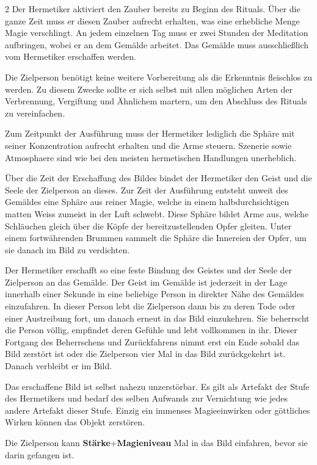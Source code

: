 \begin{multicols*}{2}
Der Hermetiker aktiviert den Zauber bereits zu Beginn des Rituals. Über die ganze Zeit muss er diesen Zauber aufrecht erhalten, was eine erhebliche Menge Magie verschlingt. An jedem einzelnen Tag muss er zwei Stunden der Meditation aufbringen, wobei er an dem Gemälde arbeitet. Das Gemälde muss ausschließlich vom Hermetiker erschaffen werden.

Die Zielperson benötigt keine weitere Vorbereitung als die Erkenntnis fleischlos zu werden. Zu diesem Zwecke sollte er sich selbst mit allen möglichen Arten der Verbrennung, Vergiftung und Ähnlichem martern, um den Abschluss des Rituals zu vereinfachen.

Zum Zeitpunkt der Ausführung muss der Hermetiker lediglich die Sphäre mit seiner Konzentration aufrecht erhalten und die Arme steuern. Szenerie sowie Atmosphaere sind wie bei den meisten hermetischen Handlungen unerheblich.

Über die Zeit der Erschaffung des Bildes bindet der Hermetiker den Geist und die Seele der Zielperson an dieses. Zur Zeit der Ausführung entsteht unweit des Gemäldes eine Sphäre aus reiner Magie, welche in einem halbdurchsichtigen matten Weiss zumeist in der Luft schwebt. Diese Sphäre bildet Arme aus, welche Schläuchen gleich über die Köpfe der bereitzustellenden Opfer gleiten. Unter einem fortwährenden Brummen sammelt die Sphäre die Innereien der Opfer, um sie danach im Bild zu verdichten.

Der Hermetiker erschafft so eine feste Bindung des Geistes und der Seele der Zielperson an das Gemälde. Der Geist im Gemälde ist jederzeit in der Lage innerhalb einer Sekunde in eine beliebige Person in direkter Nähe des Gemäldes einzufahren. In dieser Person lebt die Zielperson dann bis zu deren Tode oder einer Austreibung fort, um danach erneut in das Bild einzukehren. Sie beherrscht die Person völlig, empfindet deren Gefühle und lebt vollkommen in ihr. Dieser Fortgang des Beherrschens und Zurückfahrens nimmt erst ein Ende sobald das Bild zerstört ist oder die Zielperson vier Mal in das Bild zurückgekehrt ist. Danach verbleibt er im Bild.

Das erschaffene Bild ist selbst nahezu unzerstörbar. Es gilt als Artefakt der Stufe des Hermetikers und bedarf des selben Aufwands zur Vernichtung wie jedes andere Artefakt dieser Stufe. Einzig ein immenses Magieeinwirken oder göttliches Wirken können das Objekt zerstören.

Die Zielperson kann \textbf{Stärke}+\textbf{Magieniveau} Mal in das Bild einfahren, bevor sie darin gefangen ist.


\end{multicols*}
